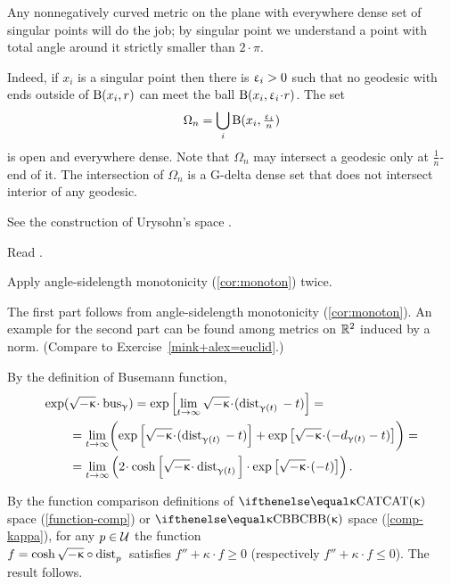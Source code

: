 

Any nonnegatively curved metric on the plane with everywhere dense set of singular points will do the job;
by singular point we understand a point with total angle around it strictly smaller than $2\cdot\pi$.

Indeed, if $x_i$ is a singular point then there is $\upvarepsilon_i>0$ such that no geodesic with ends outside of $\mathrm{B}{}(x_i,r)$ can meet the ball $\oBall(x_i,\eps_i\cdot r)$.
The set 
\[\Omega_n=\bigcup_i \mathrm{B}{}(x_i,\tfrac{\upvarepsilon_i}n)\]
is open and everywhere dense.
Note that $\Omega_n$ may intersect a geodesic only at $\tfrac1n$-end of it.
The intersection of $\Omega_n$ is a G-delta dense set that does not intersect interior of any geodesic.




 See the construction of Urysohn's space \cite[3.11$\tfrac{3}{2}_+$]{gromov-MS}.

Read \cite{lebedeva-petrunin}.

 Apply angle-sidelength  monotonicity (\ref{cor:monoton}) twice. 

 The first part follows from angle-sidelength  monotonicity (\ref{cor:monoton}).
An example for the second part can be found among metrics on $\mathbb{R}^2$ induced by a norm. (Compare to Exercise~\ref{mink+alex=euclid}.)

By the definition of Busemann function,
\begin{align*}
\exp(&\sqrt{-\kappa}\cdot\bus_\gamma) 
= \exp \left[\lim_{t\to \infty} \sqrt{-\kappa}\cdot(\distfun{{\gamma (t)}}{}{} - t)\right]=
\\
&= \lim_{t\to \infty} \biggl(\exp \left[\sqrt{-\kappa}\cdot(\distfun{\gamma (t)}{}{} -t)\right]
+\exp\left[\sqrt{-\kappa}\cdot(-d_{\gamma (t)}-t)\right]\biggr)=
\\
&=  \lim_{t\to \infty} \left(2\cdot \cosh \left[\sqrt{-\kappa}\cdot\distfun{\gamma (t)}{}{}\right]\cdot \exp\left[\sqrt{-\kappa}\cdot(-t)\right]\right).
\end{align*}

By the function comparison definitions of $\CAT\kappa$ space (\ref{function-comp}) or $\Alex{\kappa}$ space (\ref{comp-kappa}),  for any $p\in \spc{U}$ the function\\ $f=\cosh \sqrt{-\kappa}\circ\distfun{p}{}{}$ satisfies $f''+\kappa \cdot f\ge 0$ (respectively  $f''+\kappa \cdot f\le 0$). The result follows.


